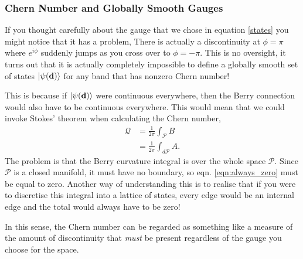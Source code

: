 \subsubsection{Chern Number and Globally Smooth Gauges}\label{sec:chern_smooth_gauge}
If you thought carefully about the gauge that we chose in equation \ref{states} you might notice that it has a problem, There is actually a discontinuity at $\phi = \pi$ where $e^{i\phi}$ suddenly jumps as you cross over to $\phi = -\pi$. This is no oversight, it turns out that it is actually completely impossible to define a globally smooth set of states $\ket{\psi(\textbf{d})}$ for any band that has nonzero Chern number!\par
This is because if $\ket{\psi(\textbf{d})}$ were continuous everywhere, then the Berry connection would also have to be continuous everywhere. This would mean that we could invoke Stokes' theorem when calculating the Chern number, 
\begin{align}
	\mathcal Q &= \frac{1}{2\pi}\int_{\mathcal P} B \\ 
	&= \frac{1}{2\pi}\int_{d \mathcal P} A. \label{eqn:always_zero}
\end{align}
The problem is that the Berry curvature integral is over the whole space $\mathcal P$. Since $\mathcal P$ is a closed manifold, it must have no boundary, so eqn. \ref{eqn:always_zero} must be equal to zero. Another way of understanding this is to realise that if you were to discretise this integral into a lattice of states, every edge would be an internal edge and the total would always have to be zero!\par
In this sense, the Chern number can be regarded as something like a measure of the amount of discontinuity that \textit{must} be present regardless of the gauge you choose for the space.

